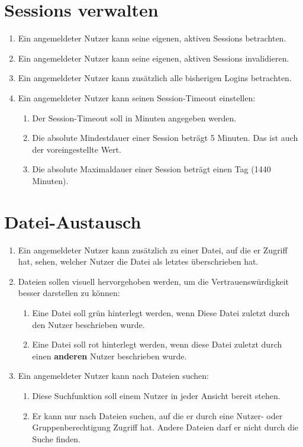 \documentclass[12pt,DIV14,BCOR10mm,a4paper,parskip=half-,headsepline,headinclude,english,ngerman,bibliography=totocnumbered]{scrreprt}
\begin{document}
\chapter{Sessions verwalten}

\begin{enumerate}
    \item Ein angemeldeter Nutzer kann seine eigenen, aktiven Sessions betrachten.
    \item Ein angemeldeter Nutzer kann seine eigenen, aktiven Sessions invalidieren.
    \item Ein angemeldeter Nutzer kann zusätzlich alle bisherigen Logins betrachten.
    \item Ein angemeldeter Nutzer kann seinen Session-Timeout einstellen:
    \begin{enumerate}
        \item Der Session-Timeout soll in Minuten angegeben werden.
        \item Die absolute Mindestdauer einer Session beträgt 5 Minuten. Das ist auch der voreingestellte Wert.
        \item Die absolute Maximaldauer einer Session beträgt einen Tag (1440 Minuten).
    \end{enumerate}
\end{enumerate}

\chapter{Datei-Austausch}

\begin{enumerate}
    \item Ein angemeldeter Nutzer kann zusätzlich zu einer Datei, auf die er Zugriff hat, sehen, welcher Nutzer die Datei als letztes überschrieben hat.
    \item Dateien sollen visuell hervorgehoben werden, um die Vertrauenswürdigkeit besser darstellen zu können:
    \begin{enumerate}
        \item Eine Datei soll grün hinterlegt werden, wenn Diese Datei zuletzt durch den Nutzer beschrieben wurde.
        \item Eine Datei soll rot hinterlegt werden, wenn diese Datei zuletzt durch einen \textbf{anderen} Nutzer beschrieben wurde.
    \end{enumerate}
    \item Ein angemeldeter Nutzer kann nach Dateien suchen:
    \begin{enumerate}
        \item Diese Suchfunktion soll einem Nutzer in jeder Ansicht bereit stehen.
        \item Er kann nur nach Dateien suchen, auf die er durch eine Nutzer- oder Gruppenberechtigung Zugriff hat. Andere Dateien darf er nicht durch die Suche finden.
    \end{enumerate}
\end{enumerate}
\end{document}
